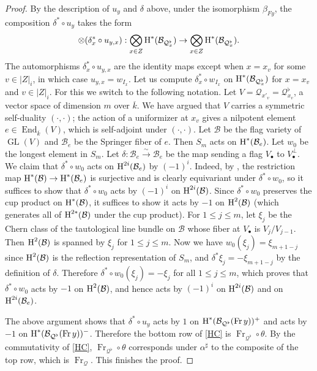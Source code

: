 \documentclass[reqno]{amsart}
\numberwithin{equation}{section}
\DeclareMathOperator{\GL}{GL}
\DeclareMathOperator{\Frob}{Fr}
\DeclareMathOperator{\Fr}{Fr}
\DeclareMathOperator{\End}{End}
\newcommand{\isom}{\stackrel{\sim}{\to}}
\newcommand{\bu}{\bullet}
\newcommand{\ov}{\overline}
\newcommand\ot{\otimes}
\renewcommand\c{\circ}
\newcommand{\cohog}[2]{\textup{H}^{#1}({#2})}     %
\renewcommand\a\alpha
\renewcommand\b\beta
\renewcommand\d\delta
\renewcommand{\th}{\theta}
\newcommand\sh{\sharp}
\newcommand\cB{\mathcal{B}}
\newcommand\cQ{\mathcal{Q}}
\theoremstyle{remark}
\numberwithin{equation}{section}
\begin{document}
\begin{proof}
By the description of $u_{y}$ and $\d$ above, under the isomorphism $\b_{Fy}$, the composition $\d^{*}\c u_{y}$ takes the form
\begin{equation*}
\ot(\d_{x}^{*}\c u_{y,x}): \bigotimes_{x\in Z}\cohog{*}{\cB_{\cQ^{\flat}_{x}}}\to\bigotimes_{x\in Z}\cohog{*}{\cB_{\cQ^{\flat}_{x}}}.
\end{equation*}
The automorphisms $\d_{x}^{*}\c u_{y,x}$ are the identity maps except when $x=x_{v}$ for some $v\in |Z|_{i}$, in which case $u_{y,x}=w_{I_{x}}$. Let us compute $\d_{x}^{*}\c w_{I_{x}}$ on $\cohog{*}{\cB_{\cQ^{\flat}_{x}}}$ for $x=x_{v}$ and $v\in |Z|_{i}$.  For this we switch to the following notation. Let $V=\cQ_{x'_{v}}=\cQ^{\flat}_{x_{v}}$, a vector space of dimension $m$ over $\ov k$. We have argued that $V$ carries a symmetric self-duality $(\cdot,\cdot)$; the action of a uniformizer at $x_{v}$ gives a nilpotent element $e\in \End_{\ov k}(V)$, which is self-adjoint under $(\cdot,\cdot)$. Let $\cB$ be the flag variety of $\GL(V)$ and $\cB_{e}$ be the Springer fiber of $e$. Then $S_{m}$ acts on $\cohog{*}{\cB_{e}}$. Let $w_{0}$ be the longest element in $S_{m}$. Let $\d: \cB_{e}\isom \cB_{e}$ be the map sending a flag $V_{\bu}$ to $V_{\bu}^{\bot}$. We claim that $\d^{*}\c w_{0}$ acts on $\cohog{2i}{\cB_{e}}$ by $(-1)^{i}$. Indeed, by \cite[Corollary 2.3(2)]{HS77}, the restriction map $\cohog{*}{\cB}\to \cohog{*}{\cB_{e}}$ is surjective and is clearly equivariant under $\d^{*}\c w_{0}$, so it suffices to show that $\d^{*}\c w_{0}$ acts by $(-1)^{i}$ on $\cohog{2i}{\cB}$. Since $\d^{*}\c w_{0}$ preserves the cup product on $\cohog{*}{\cB}$, it suffices to show it acts by $-1$ on $\cohog{2}{\cB}$ (which generates all of $\cohog{2*}{\cB}$ under the cup product). For $1\le j\le m$, let $\xi_{j}$ be  the Chern class of the tautological line bundle on $\cB$ whose fiber at $V_{\bu}$ is  $V_j/V_{j-1}$. Then $\cohog{2}{\cB}$ is spanned by $\xi_j$ for $1\le j\le m$. Now we have $w_{0}(\xi_{j})=\xi_{m+1-j}$ since $\cohog{2}{\cB}$ is the reflection representation of $S_{m}$, and $\d^{*}\xi_{j}=-\xi_{m+1-j}$ by the definition of $\d$. Therefore $\d^{*}\c w_{0}(\xi_{j})=-\xi_{j}$ for all $1\le j\le m$, which proves that $\d^{*}\c w_{0}$ acts by $-1$ on $\cohog{2}{\cB}$, and hence acts by $(-1)^{i}$ on $\cohog{2i}{\cB}$ and on $\cohog{2i}{\cB_{e}}$. 

The above argument shows that $\d^{*}\c u_{y}$ acts by $1$ on $\cohog{*}{\cB_{\cQ^{\flat}}(\Fr y)}^{+}$ and acts by $-1$ on $\cohog{*}{\cB_{\cQ^{\flat}}(\Fr y)}^{-}$. Therefore the bottom row of \eqref{HC} is $\Frob_{\cQ^{\flat}}\c\th$. By the commutativity of \eqref{HC}, $\Frob_{\cQ^{\flat}}\c\th$ corresponds under $\a^{\sh}$ to the composite of the top row, which is $\Frob_{\cQ}$. This finishes the proof.
\end{proof}
\end{document}
